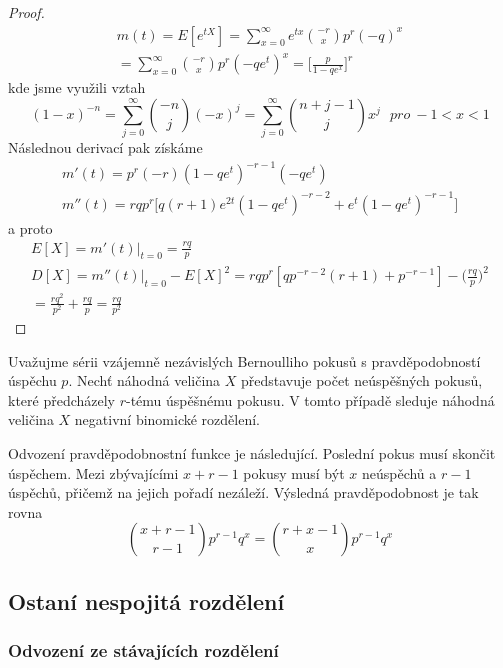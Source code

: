 \begin{proof}
\begin{gather*}
m(t) = E[e^{tX}] = \sum_{x = 0}^{\infty} e^{tx}\binom{-r}{x}p^r(-q)^x\\
= \sum_{x=0}^{\infty} \binom{-r}{x}p^r(-qe^t)^x = \Big[ \frac{p}{1 - qe^x} \Big]^r
\end{gather*}
kde jsme využili vztah
\begin{equation*}
(1 - x)^{-n} = \sum_{j = 0}^{\infty} \binom{-n}{j}(-x)^j = \sum_{j = 0}^{\infty} \binom{n + j - 1}{j} x^j~~~\textit{pro}~-1 < x < 1
\end{equation*}
Následnou derivací pak získáme
\begin{gather*}
m'(t) = p^r(-r)(1 - qe^t)^{-r-1}(-qe^t)\\
m''(t) = rqp^r \big[q(r+1)e^{2t}(1 - qe^t)^{-r-2} + e^t(1 - qe^t)^{-r-1} \big]
\end{gather*}
a proto
\begin{gather*}
E[X] = m'(t)\Big|_{t = 0} = \frac{rq}{p}\\
D[X] = m''(t)\Big|_{t = 0} - E[X]^2 = rqp^r[qp^{-r-2}(r+1) + p^{-r-1}] - \Big(\frac{rq}{p}\Big)^2\\
= \frac{rq^2}{p^2} + \frac{rq}{p} = \frac{rq}{p^2}
\end{gather*}
\end{proof}

\begin{example}
Uvažujme sérii vzájemně nezávislých Bernoulliho pokusů s pravděpodobností úspěchu $p$. Nechť náhodná veličina $X$ představuje počet neúspěšných pokusů, které předcházely $r$-tému úspěšnému pokusu. V tomto případě sleduje náhodná veličina $X$ negativní binomické rozdělení.

Odvození pravděpodobnostní funkce je následující. Poslední pokus musí skončit úspěchem. Mezi zbývajícími $x + r - 1$ pokusy musí být $x$ neúspěchů a $r - 1$ úspěchů, přičemž na jejich pořadí nezáleží. Výsledná pravděpodobnost je tak rovna
\begin{equation*}
\binom{x + r - 1}{r - 1}p^{r-1}q^x = \binom{r + x - 1}{x}p^{r-1}q^x
\end{equation*}
\end{example}

\subsection{Ostaní nespojitá rozdělení}

\subsubsection{Odvození ze stávajících rozdělení}

